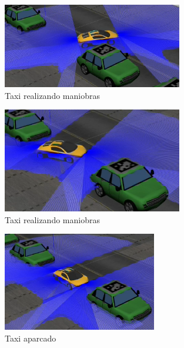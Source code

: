 \begin{figure}[H]
  \begin{center}
    \includegraphics[width=0.7\textwidth]{figures/Autopark/Experimento1_3.png}
		\caption{Taxi realizando maniobras}
		\label{fig.Experimento1_3}
		\end{center}
\end{figure}

\begin{figure}[H]
  \begin{center}
    \includegraphics[width=0.7\textwidth]{figures/Autopark/Experimento1_4.png}
		\caption{Taxi realizando maniobras}
		\label{fig.Experimento1_4}
		\end{center}
\end{figure}

\begin{figure}[H]
  \begin{center}
    \includegraphics[width=0.6\textwidth]{figures/Autopark/Experimento1_5.png}
		\caption{Taxi aparcado}
		\label{fig.Experimento1_5}
		\end{center}
\end{figure}

